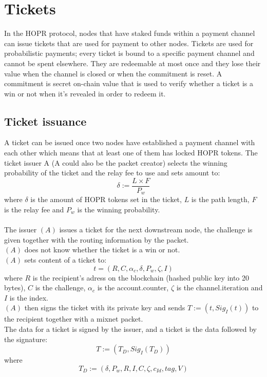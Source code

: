 \section{Tickets}
In the HOPR protocol, nodes that have staked funds within a payment channel can issue tickets that are used for payment to other nodes. 
Tickets are used for probabilistic payments; every ticket is bound to a specific payment channel and cannot be spent elsewhere. 
They are redeemable at most once and they lose their value when the channel is closed or when the commitment is reset. A commitment is secret on-chain value that is used to verify whether a ticket is a win or not when it's revealed in order to redeem it.
\subsection{Ticket issuance}
A ticket can be issued once two nodes have established a payment channel with each other which means that at least one of them has locked HOPR tokens.
\newline The ticket issuer A (A could also be the packet creator) selects the winning probability of the ticket and the relay fee to use and sets amount to:
$$\delta:=\dfrac{L\times F}{P_w}$$
where $\delta$ is the amount of HOPR tokens set in the ticket, $L$ is the path length, $F$ is the relay fee and $P_w$ is the winning probability.
\\~\\The issuer $(A)$ issues a ticket for the next downstream node, 
the challenge is given together with the routing information by the packet. 
\\$(A)$ does not know whether the ticket is a win or not.
\\$(A)$ sets content of a ticket to: $$t=(R, C, \alpha_c, \delta, P_w, \zeta, I)$$ 
where $R$ is the recipient's adress on the blockchain (hashed public key into 20 bytes), $C$ is the challenge, $\alpha_c$ is the account.counter, $\zeta$ is the channel.iteration and $I$ is the index.
\\$(A)$ then signs the ticket with its private key and sends $T:= (t, Sig_I(t))$ to the recipient together with a mixnet packet.
\\The data for a ticket is signed by the issuer, and a ticket is the data followed by the signature: $$T:=(T_D,Sig_{I}(T_D))$$ where 
    $$T_D:=(\delta,P_w,R,I,C,\zeta,c_{Id},tag,V)$$
